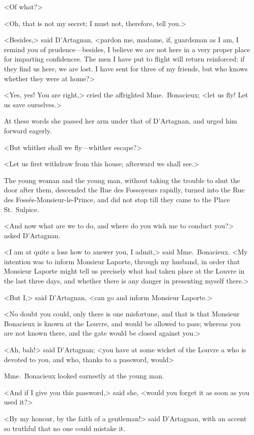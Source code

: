 <Of what?> 

<Oh, that is not my secret; I must not, therefore, tell you.> 

<Besides,> said D'Artagnan, <pardon me, madame, if, guardsman as I am, I remind you of prudence—besides, I believe we are not here in a very proper place for imparting confidences. The men I have put to flight will return reinforced; if they find us here, we are lost. I have sent for three of my friends, but who knows whether they were at home?> 

<Yes, yes! You are right,> cried the affrighted Mme.~Bonacieux; <let us fly! Let us save ourselves.> 

At these words she passed her arm under that of D'Artagnan, and urged him forward eagerly. 

<But whither shall we fly—whither escape?> 

<Let us first withdraw from this house; afterward we shall see.> 

The young woman and the young man, without taking the trouble to shut the door after them, descended the Rue des Fossoyeurs rapidly, turned into the Rue des Fossés-Monsieur-le-Prince, and did not stop till they came to the Place St.~Sulpice. 

<And now what are we to do, and where do you wish me to conduct you?> asked D'Artagnan. 

<I am at quite a loss how to answer you, I admit,> said Mme.~Bonacieux. <My intention was to inform Monsieur Laporte, through my husband, in order that Monsieur Laporte might tell us precisely what had taken place at the Louvre in the last three days, and whether there is any danger in presenting myself there.> 

<But I,> said D'Artagnan, <can go and inform Monsieur Laporte.> 

<No doubt you could, only there is one misfortune, and that is that Monsieur Bonacieux is known at the Louvre, and would be allowed to pass; whereas you are not known there, and the gate would be closed against you.> 

<Ah, bah!> said D'Artagnan; <you have at some wicket of the Louvre a  who is devoted to you, and who, thanks to a password, would\longdash> 

Mme.~Bonacieux looked earnestly at the young man. 

<And if I give you this password,> said she, <would you forget it as soon as you used it?> 

<By my honour, by the faith of a gentleman!> said D'Artagnan, with an accent so truthful that no one could mistake it. 

